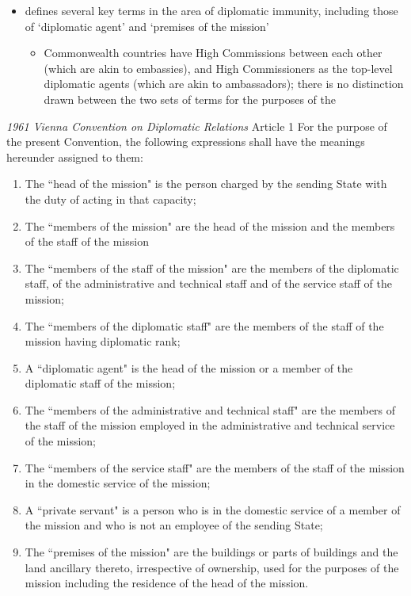 \begin{itemize}
\begin{itemize}
    \end{itemize}
    \item {} defines several key terms in the area of diplomatic immunity, including those of `diplomatic agent' and `premises of the mission'
    \begin{itemize}
        \item Commonwealth countries have High Commissions between each other (which are akin to embassies), and High Commissioners as the top-level diplomatic agents (which are akin to ambassadors); there is no distinction drawn between the two sets of terms for the purposes of the 
    \end{itemize}
\end{itemize}

\begin{conventiondetails}{\textit{1961 Vienna Convention on Diplomatic Relations} Article 1}
    \flushleft
    For the purpose of the present Convention, the following expressions shall have the meanings hereunder assigned to them:
    \begin{enumerate}[label=(\alph*)]
        \item The ``head of the mission" is the person charged by the sending State with the duty of acting in that capacity;
        \item The ``members of the mission" are the head of the mission and the members of the staff of the mission
        \item The ``members of the staff of the mission" are the members of the diplomatic staff, of the administrative and technical staff and of the service staff of the mission;
        \item The ``members of the diplomatic staff" are the members of the staff of the mission having diplomatic rank;
        \item A ``diplomatic agent" is the head of the mission or a member of the diplomatic staff of the mission;
        \item The ``members of the administrative and technical staff" are the members of the staff of the mission employed in the administrative and technical service of the mission;
        \item The ``members of the service staff" are the members of the staff of the mission in the domestic service of the mission;
        \item A ``private servant" is a person who is in the domestic service of a member of the mission and who is not an employee of the sending State;
        \item The ``premises of the mission" are the buildings or parts of buildings and the land ancillary thereto, irrespective of ownership, used for the purposes of the mission including the residence of the head of the mission.
    \end{enumerate}
\end{conventiondetails}

